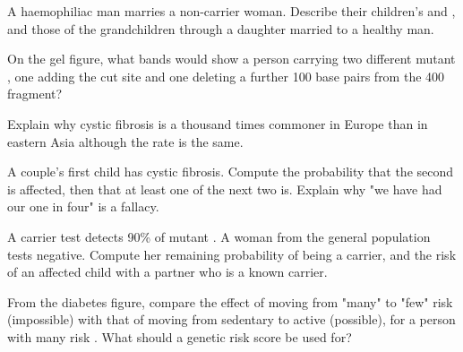 \begin{exercise}[$\star\star$]\label{exo:g11:genes-and-disease:9}
A haemophiliac man marries a non-carrier woman. Describe their
children's  and , and those of the grandchildren
through a daughter married to a healthy man.
\end{exercise}

\begin{exercise}[$\star\star$]\label{exo:g11:genes-and-disease:10}
On the gel figure, what bands would show a person carrying two
different mutant , one adding the cut site and one deleting a
further 100 base pairs from the 400 fragment?
\end{exercise}

\begin{exercise}[$\star\star$]\label{exo:g11:genes-and-disease:11}
Explain why cystic fibrosis is a thousand times commoner in Europe
than in eastern Asia although the  rate is the same.
\end{exercise}

\begin{exercise}[$\star\star\star$]\label{exo:g11:genes-and-disease:12}
A couple's first child has cystic fibrosis. Compute the probability
that the second is affected, then that at least one of the next two
is. Explain why "we have had our one in four" is a fallacy.
\end{exercise}

\begin{exercise}[$\star\star\star$]\label{exo:g11:genes-and-disease:13}
A carrier test detects 90\% of mutant . A woman from the
general population tests negative. Compute her remaining probability
of being a carrier, and the risk of an affected child with a partner
who is a known carrier.
\end{exercise}

\begin{exercise}[$\star\star\star$]\label{exo:g11:genes-and-disease:14}
From the diabetes figure, compare the effect of moving from "many"
to "few" risk  (impossible) with that of moving from sedentary
to active (possible), for a person with many risk . What
should a genetic risk score be used for?
\end{exercise}

